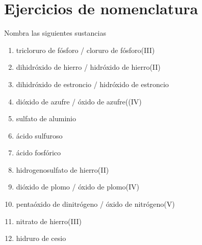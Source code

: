 \section{Ejercicios de nomenclatura}

\begin{exercise}[
    tags    = {inorgánica,nomenclatura,múltiple,2B},
    topics  = {química inorgánica,formulación,nomenclatura},
    source  = {Química 2B SAN 2016, p372, e6},
  ]
  Nombra las siguientes sustancias

  \begin{enumerate}\begin{multicols}{2}
    \item {}
    \item {}
    \item {}
    \item {}
    \item {}
    \item {}
    \item {}
    \item {}
    \item {}
    \item {}
    \item {}
    \item {}
  \end{multicols}\end{enumerate}
\end{exercise}

\begin{solution}
  \begin{enumerate}
    \item tricloruro de fósforo / cloruro de fósforo(III)
    \item dihidróxido de hierro / hidróxido de hierro(II)
    \item dihidróxido de estroncio / hidróxido de estroncio
    \item dióxido de azufre / óxido de azufre((IV)
    \item sulfato de aluminio
    \item ácido sulfuroso
    \item ácido fosfórico
    \item hidrogenosulfato de hierro(II)
    \item dióxido de plomo / óxido de plomo(IV)
    \item pentaóxido de dinitrógeno / óxido de nitrógeno(V)
    \item nitrato de hierro(III)
    \item hidruro de cesio
  \end{enumerate}
\end{solution}




